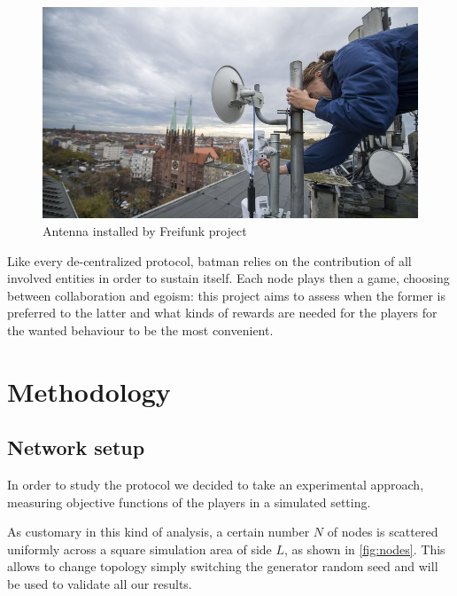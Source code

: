 \documentclass[conference,10.5pt]{IEEEtran}
\begin{document}
\begin{figure}[h]
  \centering
  \includegraphics[width=0.8\linewidth]{figures/batman_antenna}
  \caption{Antenna installed by Freifunk project}
  \label{fig:freifunk_img}
\end{figure}

\smallskip

Like every de-centralized protocol, \gls{batman} relies on the contribution of all involved entities in order to sustain itself. Each node plays then a game, choosing between collaboration and egoism: this project aims to assess when the former is preferred to the latter and what kinds of rewards are needed for the players for the wanted behaviour to be the most convenient.

\section{Methodology}

\subsection{Network setup}

In order to study the protocol we decided to take an experimental approach, measuring objective functions of the players in a simulated setting.

As customary in this kind of analysis, a certain number $N$ of nodes is scattered uniformly across a square simulation area of side $L$, as shown in \autoref{fig:nodes}. This allows to change topology simply switching the generator random seed and will be used to validate all our results.
\end{document}
